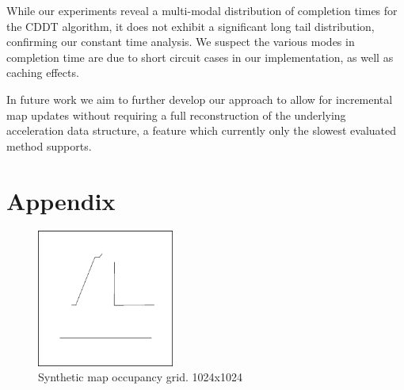 \documentclass[letterpaper, 10 pt, conference]{ieeeconf}  %
\newcommand{\img}[1]{\begin{center}\texttt{[image: \{\#1]}}\end{center}}
\begin{document}
While our experiments reveal a multi-modal distribution of completion times for the CDDT algorithm, it does not exhibit a significant long tail distribution, confirming our constant time analysis. We suspect the various modes in completion time are due to short circuit cases in our implementation, as well as caching effects.

In future work we aim to further develop our approach to allow for incremental map updates without requiring a full reconstruction of the underlying acceleration data structure, a feature which currently only the slowest evaluated method supports.
\addtolength{\textheight}{0cm}   %

\section*{Appendix}

\begin{figure}[h!]
\begin{center}\includegraphics[width=4.5cm]{synthetic_border.png}\end{center}
\setlength{\belowcaptionskip}{-10pt}
\caption{Synthetic map occupancy grid. 1024x1024}
\label{synthetic_map}
\end{figure}
\end{document}
